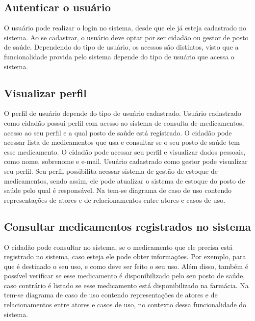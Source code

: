 \subsection{Autenticar o usuário}

O usuário pode realizar o login no sistema, desde que ele já esteja cadastrado no sistema. Ao se cadastrar, o usuário deve optar por ser cidadão ou gestor de posto de saúde. Dependendo do tipo de usuário, os acessos são distintos, visto que a funcionalidade provida pelo sistema depende do tipo de usuário que acessa o sistema.

\subsection{Visualizar perfil}

O perfil de usuário depende do tipo de usuário cadastrado. Usuário  cadastrado como cidadão possui perfil com acesso ao sistema de consulta de medicamentos, acesso ao seu perfil e a qual posto de saúde está registrado. O cidadão pode acessar lista de medicamentos que usa e consultar se o seu posto de saúde tem esse medicamento. O cidadão pode acessar seu perfil e visualizar dados pessoais, como nome, sobrenome e e-mail. Usuário cadastrado como gestor pode visualizar seu perfil. Seu perfil possibilita acessar sistema de gestão de estoque de medicamentos, sendo assim, ele pode atualizar o sistema de estoque do posto de saúde pelo qual é responsável. Na  tem-se diagrama de caso de uso contendo representações de atores e de relacionamentos entre atores e casos de uso.


%

\subsection{Consultar medicamentos registrados no sistema}

O cidadão pode consultar no sistema, se o medicamento que ele precisa está registrado no sistema, caso esteja ele pode obter informações. Por exemplo, para que é destinado o seu uso, e como deve ser feito o seu uso. Além disso, também é possível verificar se esse medicamento é disponibilizado pelo seu posto de saúde, caso contrário é listado se esse medicamento está disponibilizado na farmácia. Na  tem-se diagrama de caso de uso contendo representações de atores e de relacionamentos entre atores e casos de uso, no contexto dessa funcionalidade do sistema.

